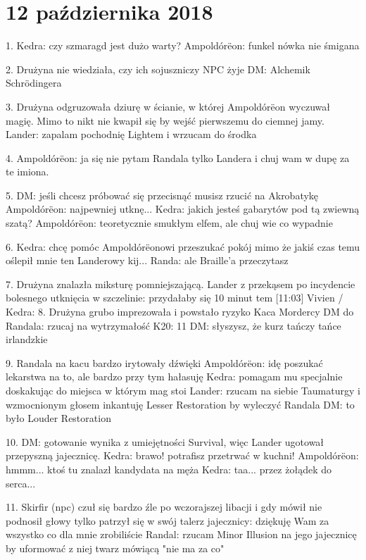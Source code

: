 \documentclass[10pt,twoside,twocolumn]{book}
\begin{document}
\section*{12 października 2018}

1. Kedra: czy szmaragd jest dużo warty?
Ampoldórëon: funkel nówka nie śmigana

2. Drużyna nie wiedziała, czy ich sojuszniczy NPC żyje
DM: Alchemik Schrödingera

3. Drużyna odgruzowała dziurę w ścianie, w której Ampoldórëon wyczuwał magię. Mimo to nikt nie kwapił się by wejść pierwszemu do ciemnej jamy.
Lander: zapalam pochodnię Lightem i wrzucam do środka

4. Ampoldórëon: ja się nie pytam Randala tylko Landera i chuj wam w dupę za te imiona.

5. DM: jeśli chcesz próbować się przecisnąć musisz rzucić na Akrobatykę
Ampoldórëon: najpewniej utknę...
Kedra: jakich jesteś gabarytów pod tą zwiewną szatą?
Ampoldórëon: teoretycznie smukłym elfem, ale chuj wie co wypadnie

6. Kedra: chcę pomóc Ampoldórëonowi przeszukać pokój mimo że jakiś czas temu oślepił mnie ten Landerowy kij...
Randa: ale Braille'a przeczytasz

7. Drużyna znalazła miksturę pomniejszającą.
Lander z przekąsem po incydencie bolesnego utknięcia w szczelinie: przydałaby się 10 minut tem
[11:03] Vivien / Kedra: 8. Drużyna grubo imprezowała i powstało ryzyko Kaca Mordercy
DM do Randala: rzucaj na wytrzymałość
K20: 11
DM: słyszysz, że kurz tańczy tańce irlandzkie

9. Randala na kacu bardzo irytowały dźwięki
Ampoldórëon: idę poszukać lekarstwa na to, ale bardzo przy tym hałasuję
Kedra: pomagam mu specjalnie doskakując do miejsca w którym mag stoi
Lander: rzucam na siebie Taumaturgy i wzmocnionym głosem inkantuję Lesser Restoration by wyleczyć Randala
DM: to było Louder Restoration

10. DM: gotowanie wynika z umiejętności Survival, więc Lander ugotował przepyszną jajecznicę.
Kedra: brawo! potrafisz przetrwać w kuchni!
Ampoldórëon: hmmm... ktoś tu znalazł kandydata na męża
Kedra: taa... przez żołądek do serca...

11. Skirfir (npc) czuł się bardzo źle po wczorajszej libacji i gdy mówił nie podnosił głowy tylko patrzył się w swój talerz jajecznicy: dziękuję Wam za wszystko co dla mnie zrobiliście
Randal: rzucam Minor Illusion na jego jajecznicę by uformować z niej twarz mówiącą "nie ma za co"
\end{document}
